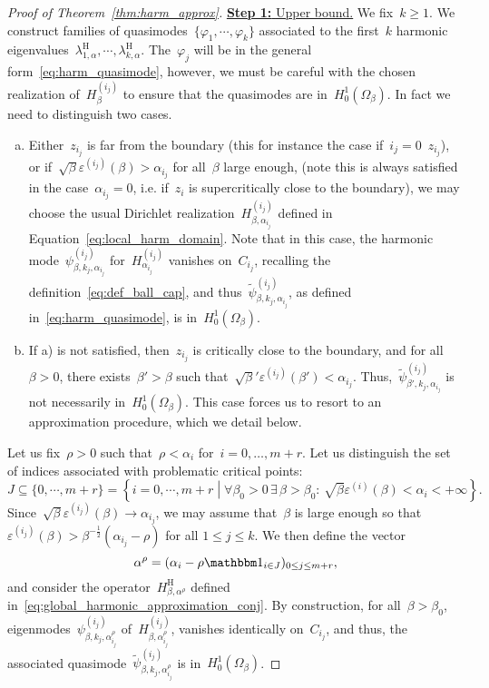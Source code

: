 \documentclass[10pt]{article}
\newcommand{\1}{\mathbbm 1}
\newcommand{\shift}{\rho} %
\begin{document}
\begin{proof}[Proof of Theorem~\ref{thm:harm_approx}]
        {\underline{{\bf Step 1: }Upper bound.}}\newline
        We fix~$k\geq 1$. We construct families of quasimodes~$\{\varphi_1,\dotsm,\varphi_k\}$ associated to the first~$k$ harmonic eigenvalues~$\lambda_{1,\alpha}^{\mathrm H},\dotsm,\lambda_{k,\alpha}^{\mathrm H}$.
        The~$\varphi_{j}$ will be in the general form~\eqref{eq:harm_quasimode}, however, we must be careful with the chosen realization of~$H_\beta^{(i_j)}$ to ensure that the quasimodes are in~$H_0^1(\Omega_\beta)$.
        In fact we need to distinguish two cases.
        \begin{enumerate}[a)]
            \item{Either~$z_{i_j}$ is far from the boundary (this for instance the case if~$i_j=0$~$z_{i_j}$), or if~$\sqrt\beta\varepsilon^{(i_j)}(\beta)>\alpha_{i_j}$ for all~$\beta$ large enough, (note this is always satisfied in the case~$\alpha_{i_j}=0$, i.e. if~$z_i$ is supercritically close to the boundary), we may choose the usual Dirichlet realization~$H_{\beta,\alpha_{i_j}}^{(i_j)}$ defined in Equation~\eqref{eq:local_harm_domain}. Note that in this case, the harmonic mode~$\psi^{(i_j)}_{\beta,k_j,\alpha_{i_j}}$ for~$H_{\alpha_{i_j}}^{(i_j)}$ vanishes on~$C_{i_j}$, recalling the definition~\eqref{eq:def_ball_cap}, and thus~$\widetilde\psi^{(i_j)}_{\beta,k_j,\alpha_{i_j}}$, as defined in~\eqref{eq:harm_quasimode}, is in~$H_0^1(\Omega_\beta)$.}
            \item{If a) is not satisfied, then~$z_{i_j}$ is critically close to the boundary, and for all~$\beta>0$, there exists~$\beta'>\beta$ such that~$\sqrt\beta'\varepsilon^{(i_j)}(\beta')<\alpha_{i_j}$. Thus,~$\widetilde \psi^{(i_j)}_{\beta',k_j,\alpha_{i_j}}$ is not necessarily in~$H_0^1(\Omega_\beta)$. This case forces us to resort to an approximation procedure, which we detail below.}
        \end{enumerate}

        Let us fix~$\shift>0$ such that~$\shift<\alpha_i$ for~$i=0,\dots,m+r$.
        Let us distinguish the set of indices associated with problematic critical points:
       ~$$J \subseteq \{0,\dotsm,m+r\} = \left\{i = 0,\dotsm,m+r\middle| \forall \beta_0>0\,\exists\, \beta>\beta_0:\,\sqrt\beta\varepsilon^{(i)}(\beta) < \alpha_i < +\infty\right\}.$$
        Since~$\sqrt\beta\varepsilon^{(i_j)}(\beta)\to \alpha_{i_j}$, we may assume that~$\beta$ is large enough so that~$\varepsilon^{(i_j)}(\beta) > \beta^{-\frac12}\left(\alpha_{i_j}-\shift\right)$ for all $1\leq j\leq k$.
        We then define the vector
        \[\alpha^\shift = (\alpha_i - \shift\1_{i\in J})_{0\leq j\leq m+r},\]
        and consider the operator~$H_{\beta,\alpha^\shift}^{\mathrm H}$ defined in~\eqref{eq:global_harmonic_approximation_conj}.
        By construction, for all~$\beta>\beta_0$, eigenmodes~$\psi_{\beta,k_j,\alpha^\shift_{i_j}}^{(i_j)}$ of~$H_{\beta,\alpha^\shift_{i_j}}^{(i_j)}$, vanishes identically on~$C_{i_j}$, and thus, the associated quasimode~$\widetilde\psi_{\beta,k_j,\alpha^\shift_{i_j}}^{(i_j)}$ is in~$H_0^1(\Omega_\beta)$.
        

\end{proof}
\end{document}
